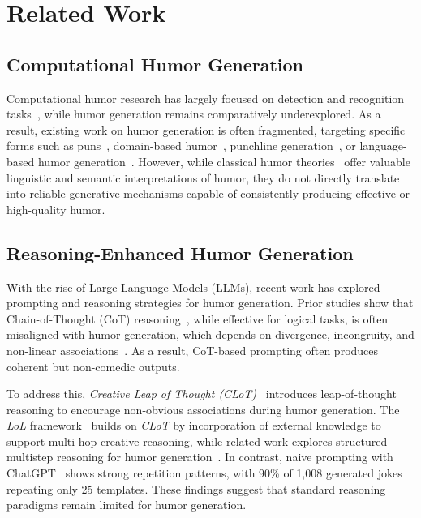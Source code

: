\documentclass[11pt]{article}
\begin{document}
\section{Related Work}

\subsection{Computational Humor Generation}

Computational humor research has largely focused on detection and recognition tasks~\cite{jentzsch2023chatgpt, dsilva2024augmenting}, while humor generation remains comparatively underexplored. As a result, existing work on humor generation is often fragmented, targeting specific forms such as puns~\cite{chen_are_2024}, domain-based humor~\cite{shafiei_not_2025}, punchline generation~\cite{zhang2020let}, or language-based humor generation~\cite{chen2023can, zhong_lets_2024}. However, while classical humor theories~\cite{lintott2016superiority, scheel2025definitions, mcgraw2010benign, ajayiautomatic} offer valuable linguistic and semantic interpretations of humor, they do not directly translate into reliable generative mechanisms capable of consistently producing effective or high-quality humor.

\subsection{Reasoning-Enhanced Humor Generation}

With the rise of Large Language Models (LLMs), recent work has explored prompting and reasoning strategies for humor generation. Prior studies show that Chain-of-Thought (CoT) reasoning~\cite{wei2022chain}, while effective for logical tasks, is often misaligned with humor generation, which depends on divergence, incongruity, and non-linear associations~\cite{zhong_lets_2024, wang_innovative_2025, tikhonov_humor_2024}. As a result, CoT-based prompting often produces coherent but non-comedic outputs.

To address this, \textit{Creative Leap of Thought (CLoT)}~\cite{zhong_lets_2024} introduces leap-of-thought reasoning to encourage non-obvious associations during humor generation. The \textit{LoL} framework~\cite{wang_innovative_2025} builds on \textit{CLoT} by incorporation of external knowledge to support multi-hop creative reasoning, while related work explores structured multistep reasoning for humor generation~\cite{tikhonov_humor_2024}. In contrast, naive prompting with ChatGPT~\cite{jentzsch2023chatgpt} shows strong repetition patterns, with 90\% of 1,008 generated jokes repeating only 25 templates. These findings suggest that standard reasoning paradigms remain limited for humor generation.
\end{document}
